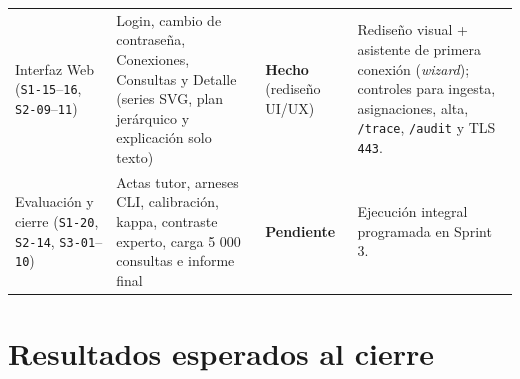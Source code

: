 \documentclass[12pt,a4paper]{article}
\begin{document}
\begin{longtable}{p{} p{} p{} p{}}
Interfaz Web (\texttt{S1-15}--\texttt{16}, \texttt{S2-09}--\texttt{11}) & Login, cambio de contraseña, Conexiones, Consultas y Detalle (series SVG, plan jerárquico y explicación solo texto) & \textbf{Hecho} (rediseño UI/UX) & Rediseño visual + asistente de primera conexión (\textit{wizard}); controles para ingesta, asignaciones, alta, \texttt{/trace}, \texttt{/audit} y TLS \texttt{443}. \\
Evaluación y cierre (\texttt{S1-20}, \texttt{S2-14}, \texttt{S3-01}--\texttt{10}) & Actas tutor, arneses CLI, calibración, kappa, contraste experto, carga 5 000 consultas e informe final & \textbf{Pendiente} & Ejecución integral programada en Sprint 3. \\
\end{longtable}
\endgroup

\section{Resultados esperados al cierre}
\end{document}
